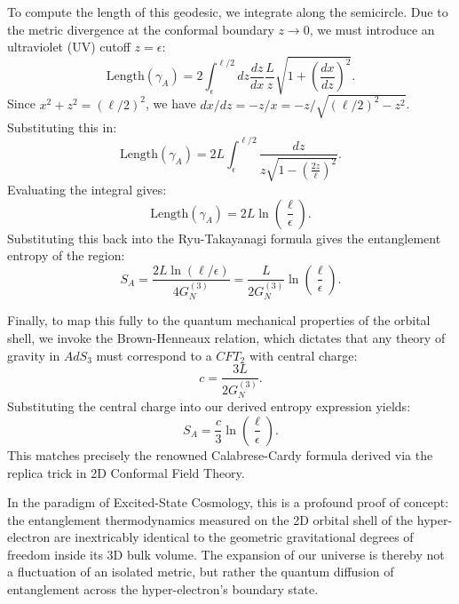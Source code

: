 To compute the length of this geodesic, we integrate along the semicircle. Due to the metric divergence at the conformal boundary $z \to 0$, we must introduce an ultraviolet (UV) cutoff $z = \epsilon$:
\begin{equation}
    \text{Length}(\gamma_A) = 2 \int_{\epsilon}^{\ell/2} dz \frac{dz}{dx} \frac{L}{z} \sqrt{1 + \left(\frac{dx}{dz}\right)^2}.
\end{equation}
Since $x^2 + z^2 = (\ell/2)^2$, we have $dx/dz = -z/x = -z/\sqrt{(\ell/2)^2 - z^2}$. Substituting this in:
\begin{equation}
    \text{Length}(\gamma_A) = 2L \int_{\epsilon}^{\ell/2} \frac{dz}{z \sqrt{1 - \left(\frac{2z}{\ell}\right)^2}}.
\end{equation}
Evaluating the integral gives:
\begin{equation}
    \text{Length}(\gamma_A) = 2L \ln \left( \frac{\ell}{\epsilon} \right).
\end{equation}
Substituting this back into the Ryu-Takayanagi formula gives the entanglement entropy of the region:
\begin{equation}
    S_A = \frac{2L \ln(\ell/\epsilon)}{4G_N^{(3)}} = \frac{L}{2G_N^{(3)}} \ln\left( \frac{\ell}{\epsilon} \right).
\end{equation}

Finally, to map this fully to the quantum mechanical properties of the orbital shell, we invoke the Brown-Henneaux relation, which dictates that any theory of gravity in $AdS_3$ must correspond to a $CFT_2$ with central charge:
\begin{equation}
    c = \frac{3L}{2G_N^{(3)}}.
\end{equation}
Substituting the central charge into our derived entropy expression yields:
\begin{equation}
    S_A = \frac{c}{3} \ln\left( \frac{\ell}{\epsilon} \right).
\end{equation}
This matches precisely the renowned Calabrese-Cardy formula derived via the replica trick in 2D Conformal Field Theory. 

In the paradigm of Excited-State Cosmology, this is a profound proof of concept: the entanglement thermodynamics measured on the 2D orbital shell of the hyper-electron are inextricably identical to the geometric gravitational degrees of freedom inside its 3D bulk volume. The expansion of our universe is thereby not a fluctuation of an isolated metric, but rather the quantum diffusion of entanglement across the hyper-electron's boundary state.


